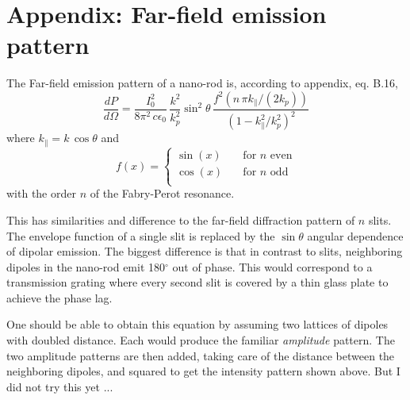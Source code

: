 \section{Appendix: Far-field emission pattern}

The Far-field emission pattern of a nano-rod is, according to \cite{Dorfmueller10_thesis} appendix, eq. B.16,
\begin{equation}
  \frac{dP}{d\Omega} = \frac{I_0^2}{8 \pi^2 \, c \epsilon_0} \, 
  \frac{k^2}{k_p^2} \sin^2 \theta \,
     \frac{f^2 \left( n \, \pi  k_\parallel  / (2 k_p)  \right)} 
     {\left( 1 - k_\parallel^2  / k_p^2 \right)^2
     } 
\end{equation}
where $k_\parallel = k \, \cos \theta$ and
\begin{equation*}
  f(x) = \left\lbrace \begin{matrix}
     \sin(x) & \quad \text{for } n \text{ even} \\ 
    \cos(x)  &\quad \text{for } n \text{ odd} \\ 
  \end{matrix} \right.
\end{equation*}
with the order $n$ of the Fabry-Perot resonance.

This has similarities and difference to the far-field diffraction pattern of $n$ slits. The envelope function of a single slit is replaced by the $\sin \theta$ angular dependence of dipolar emission. The biggest difference is that in contrast to slits, neighboring dipoles in the nano-rod emit 180$^\circ$ out of phase. This would correspond to a transmission grating where every second slit is covered by a thin glass plate to achieve the phase lag. 

One should be able to obtain this equation by assuming two lattices of dipoles with  doubled distance. Each would produce the familiar \emph{amplitude} pattern. The two amplitude patterns are then added, taking care of the distance between the neighboring dipoles, and squared to get the intensity pattern shown above. But I did not try this yet ...







\printbibliography[segment=\therefsegment,heading=subbibliography]




